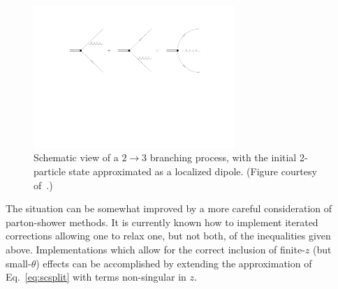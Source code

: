 \begin{enumerate}
\begin{figure}[tb!]
	\centering
	\includegraphics[width=0.68\textwidth,trim={5cm 11cm 5cm 3cm},clip]{figures/DS_dipole.pdf}
	\caption{Schematic view of a $2 \to 3$ branching process, with the initial 2-particle state approximated as a localized dipole. (Figure courtesy of~\cite{Ellis:1991qj}.)}
	\label{fig:dipoleant}
\end{figure}

The situation can be somewhat improved by a more careful consideration of parton-shower methods. It is currently known how to implement iterated corrections allowing one to relax one, but not both, of the inequalities given above. Implementations which allow for the correct inclusion of finite-$z$ (but small-$\theta$) effects can be accomplished by extending the approximation of Eq.~\eqref{eq:scsplit} with terms non-singular in $z$.


\end{enumerate}
